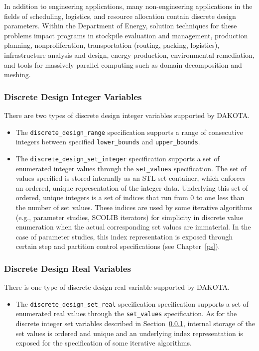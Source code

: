 In addition to engineering applications, many non-engineering
applications in the fields of scheduling, logistics, and resource
allocation contain discrete design parameters. Within the Department
of Energy, solution techniques for these problems impact programs in
stockpile evaluation and management, production planning,
nonproliferation, transportation (routing, packing, logistics),
infrastructure analysis and design, energy production, environmental
remediation, and tools for massively parallel computing such as domain
decomposition and meshing.

\subsubsection{Discrete Design Integer Variables}\label{variables:design:ddiv}

There are two types of discrete design integer variables supported by
DAKOTA.
\begin{itemize}

\item  The \texttt{discrete\_design\_range} specification supports a
range of consecutive integers between specified \texttt{lower\_bounds}
and \texttt{upper\_bounds}.

\item The \texttt{discrete\_design\_set\_integer} specification supports 
a set of enumerated integer values through the \texttt{set\_values} 
specification.  The set of values specified is stored internally as an 
STL set container, which enforces an ordered, unique representation of 
the integer data.  Underlying this set of ordered, unique integers is a 
set of indices that run from 0 to one less than the number of set values.
These indices are used by some iterative algorithms (e.g., parameter 
studies, SCOLIB iterators) for simplicity in discrete value enumeration 
when the actual corresponding set values are immaterial.  In the case of 
parameter studies, this index representation is exposed through certain 
step and partition control specifications (see Chapter~\ref{ps}).

\end{itemize}

\subsubsection{Discrete Design Real Variables}\label{variables:design:ddrv}

There is one type of discrete design real variable supported by
DAKOTA.
\begin{itemize}

\item The \texttt{discrete\_design\_set\_real} specification
specification supports a set of enumerated real values through the
\texttt{set\_values} specification.  As for the discrete integer
set variables described in Section~\ref{variables:design:ddiv},
internal storage of the set values is ordered and unique and an
underlying index representation is exposed for the specification of
some iterative algorithms.

\end{itemize}


